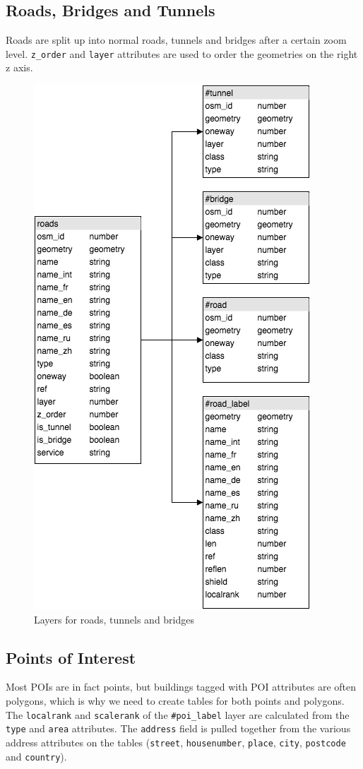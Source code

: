 \newpage
\subsection{Roads, Bridges and Tunnels}
Roads are split up into normal roads, tunnels and bridges after a certain zoom level. \texttt{z\_order} and \texttt{layer} attributes are used to order the geometries on the right z axis.

\begin{figure}[H]
\centering
  \includegraphics[scale=0.6]{images/road_layer.png}
  \caption{Layers for roads, tunnels and bridges}
\end{figure}

\newpage
\subsection{Points of Interest}
Most POIs are in fact points, but buildings tagged with POI attributes
are often polygons, which is why we need to create tables for both points and polygons.
The \texttt{localrank} and \texttt{scalerank} of the \texttt{\#poi\_label} layer are calculated from the \texttt{type} and \texttt{area} attributes.
The \texttt{address} field is pulled together from the various address attributes on the tables (\texttt{street}, \texttt{housenumber}, \texttt{place}, \texttt{city}, \texttt{postcode} and \texttt{country}).

